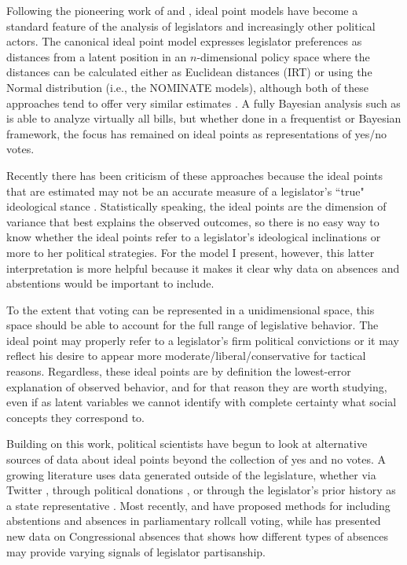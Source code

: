 	Following the pioneering work of \textcite{poole1997} and \textcite{jackman2004}, ideal point models have become a standard feature of the analysis of legislators and increasingly other political actors. The canonical ideal point model expresses legislator preferences as distances from a latent position in an $n$-dimensional policy space \parencite{enelow198} where the distances can be calculated either as Euclidean distances (IRT) or using the Normal distribution (i.e., the NOMINATE models), although both of these approaches tend to offer very similar estimates  \parencite{carroll2009}. A fully Bayesian analysis such as \textcite{jackman2004} is able to analyze virtually all bills, but whether done in a frequentist or Bayesian framework, the focus has remained on ideal points as representations of yes/no votes.
	
	Recently there has been criticism of these approaches because the ideal points that are estimated may not be an accurate measure of a legislator's ``true" ideological stance \parencite{krehbiel2014,Caughey2016,brauninger2016}. Statistically speaking, the ideal points are the dimension of variance that best explains the observed outcomes, so there is no easy way to know whether the ideal points refer to a legislator's ideological inclinations or more to her political strategies. For the model I present, however, this latter interpretation is more helpful because it makes it clear why data on absences and abstentions would be important to include.
	
	To the extent that voting can be represented in a unidimensional space, this space should be able to account for the full range of legislative behavior. The ideal point may properly refer to a legislator's firm political convictions or it may reflect his desire to appear more moderate/liberal/conservative for tactical reasons. Regardless, these ideal points are by definition the lowest-error explanation of observed behavior, and for that reason they are worth studying, even if as latent variables we cannot identify with complete certainty what social concepts they correspond to.
	
	Building on this work, political scientists have begun to look at alternative sources of data about ideal points beyond the collection of yes and no votes. A growing literature uses data generated outside of the legislature, whether via Twitter \parencite{barbera2015}, through political donations \parencite{bonica2014}, or through the legislator's prior history as a state representative \parencite{shor2011}. Most recently, \textcite{brauninger2016} and \textcite{rosas2015} have proposed methods for including abstentions and absences in parliamentary rollcall voting, while \textcite{powell2016} has presented new data on Congressional absences that shows how different types of absences may provide varying signals of legislator partisanship.
	
